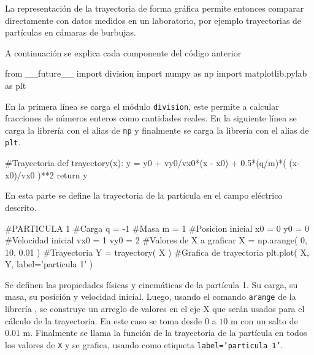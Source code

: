 La representación de la trayectoria de forma gráfica permite entonces 
comparar directamente con datos medidos en un laboratorio, por ejemplo 
trayectorias de partículas en cámaras de burbujas.

\newpage

A continuación se explica cada componente del código anterior


\begin{listing}[style=python, numbers = none]
from __future__ import division
import numpy as np
import matplotlib.pylab as plt
\end{listing}
En la primera línea se carga el módulo \texttt{division}, este permite a 
\python calcular fracciones de números enteros como cantidades reales. En
la siguiente línea se carga la librería \numpy con el alias de \texttt{np}
y finalmente se carga la librería \matplotlib con el alias de \texttt{plt}.


\begin{listing}[style=python, numbers = none]
#Trayectoria
def trayectory(x):
    y = y0 + vy0/vx0*(x - x0) + 0.5*(q/m)*( (x-x0)/vx0 )**2
    return y
\end{listing}
En esta parte se define la trayectoria de la partícula en el campo 
eléctrico descrito.

\begin{listing}[style=python, numbers = none]    
#PARTICULA 1
#Carga
q = -1
#Masa
m = 1
#Posicion inicial
x0 = 0
y0 = 0
#Velocidad inicial
vx0 = 1
vy0 = 2
#Valores de X a graficar
X = np.arange( 0, 10, 0.01 )
#Trayectoria
Y = trayectory( X )
#Grafica de trayectoria
plt.plot( X, Y, label='particula 1' )
\end{listing}
Se definen las propiedades físicas y cinemáticas de la partícula 1. Su 
carga, su masa, su posición y velocidad inicial. Luego, usando el comando
\texttt{arange} de la librería \numpy, se construye un arreglo de valores 
en el eje X que serán usados para el cálculo de la trayectoria. En este 
caso se toma desde 0 a $10$ m con un salto de $0.01$ m. Finalmente se 
llama la función de la trayectoria de la partícula en todos los valores de
\texttt{X} y se grafica, usando como etiqueta \texttt{label='particula 1'}.



